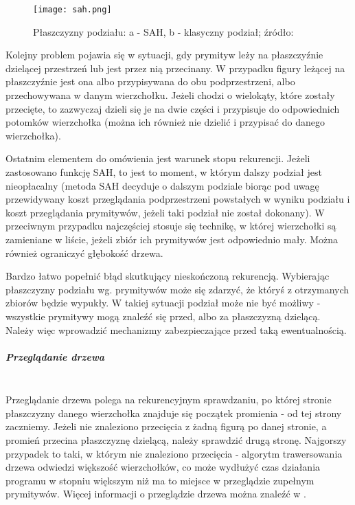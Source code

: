 \begin{figure}[H]
\centering
  \texttt{[image: sah.png]}
  \caption{Płaszczyzny podziału: a - SAH, b - klasyczny podział; źródło: \cite{zuk2008}}
\end{figure}

\pagebreak
Kolejny problem pojawia się w sytuacji, gdy prymityw leży na płaszczyźnie dzielącej przestrzeń lub jest przez nią przecinany. W przypadku figury leżącej na płaszczyźnie jest ona albo przypisywana do obu podprzestrzeni, albo przechowywana w danym wierzchołku. Jeżeli chodzi o wielokąty, które zostały przecięte, to zazwyczaj dzieli się je na dwie części i przypisuje do odpowiednich potomków wierzchołka (można ich również nie dzielić i przypisać do danego wierzchołka).

Ostatnim elementem do omówienia jest warunek stopu rekurencji. Jeżeli zastosowano funkcję SAH, to jest to moment, w którym dalszy podział jest nieopłacalny (metoda SAH decyduje o dalszym podziale biorąc pod uwagę przewidywany koszt przeglądania podprzestrzeni powstałych w wyniku podziału i koszt przeglądania prymitywów, jeżeli taki podział nie został dokonany). W przeciwnym przypadku najczęściej stosuje się technikę, w której wierzchołki są zamieniane w liście, jeżeli zbiór ich prymitywów jest odpowiednio mały. Można również ograniczyć głębokość drzewa. 

Bardzo łatwo popełnić błąd skutkujący nieskończoną rekurencją. Wybierając płaszczyzny podziału wg. prymitywów może się zdarzyć, że któryś z otrzymanych zbiorów będzie wypukły. W takiej sytuacji podział może nie być możliwy - wszystkie prymitywy mogą znaleźć się przed, albo za płaszczyzną dzielącą. Należy więc wprowadzić mechanizmy zabezpieczające przed taką ewentualnością.

\subparagraph{Przeglądanie drzewa}\mbox{} \\

Przeglądanie drzewa polega na rekurencyjnym sprawdzaniu, po której stronie płaszczyzny danego wierzchołka znajduje się początek promienia - od tej strony zaczniemy. Jeżeli nie znaleziono przecięcia z żadną figurą po danej stronie, a promień przecina płaszczyznę dzielącą, należy sprawdzić drugą stronę. Najgorszy przypadek to taki, w którym nie znaleziono przecięcia - algorytm trawersowania drzewa odwiedzi większość wierzchołków, co może wydłużyć czas działania programu w stopniu większym niż ma to miejsce w przeglądzie zupełnym prymitywów. Więcej informacji o przeglądzie drzewa można znaleźć w \cite{bspfaq, trees}.